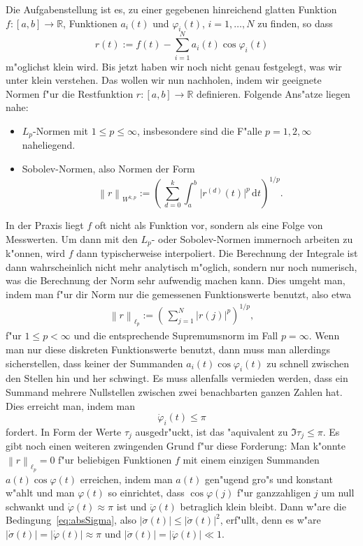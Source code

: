 \documentclass[a4paper]{scrartcl}
\newcommand{\R}{{\mathbb{R}}}
\newcommand{\de}{{\mathrm{d}}}
\newcommand{\norm}[1]{{\left\lVert#1\right\rVert}}
\newcommand{\pphi}{{\varphi}}
\begin{document}
Die Aufgabenstellung ist es, zu einer gegebenen hinreichend glatten Funktion $f:[a,b]\to\R$, Funktionen $a_i(t)$ und $\pphi_i(t)$, $i=1,\dotsc,N$ zu finden, so dass 
$$ r(t) := f(t)-\sum_{i=1}^N a_i(t)\cos\pphi_i(t) $$
m"oglichst klein wird. 
Bis jetzt haben wir noch nicht genau festgelegt, was wir unter \glqq{}klein\grqq{} verstehen. 
Das wollen wir nun nachholen, indem wir geeignete Normen f"ur die Restfunktion $r:[a,b]\to\R$ definieren. 
Folgende Ans"atze liegen nahe:
\begin{itemize}
\item $L_p$-Normen mit $1\le p\le\infty$, insbesondere sind die F"alle $p=1,2,\infty$ naheliegend. 
\item Sobolev-Normen, also Normen der Form
$$ \norm{r}_{W^{k,p}} := \left(\,\sum_{d=0}^k\int_a^b \lvert r^{(d)}(t)\rvert^p\,\de t\right)^{1/p}. $$
\end{itemize}
In der Praxis liegt $f$ oft nicht als Funktion vor, sondern als eine Folge von Messwerten. 
Um dann mit den $L_p$- oder Sobolev-Normen immernoch arbeiten zu k"onnen, wird $f$ dann typischerweise interpoliert. 
Die Berechnung der Integrale ist dann wahrscheinlich nicht mehr analytisch m"oglich, sondern nur noch numerisch, was die Berechnung der Norm sehr aufwendig machen kann. 
Dies umgeht man, indem man f"ur dir Norm nur die gemessenen Funktionswerte benutzt, also etwa
\begin{align} \label{eq:lpnormr}
\norm{r}_{\ell_p} := \left(\,\sum_{j=1}^{N}\lvert r(j)\rvert^p\right)^{1/p},
\end{align}
f"ur $1\le p<\infty$ und die entsprechende Supremumsnorm im Fall $p=\infty$. 
Wenn man nur diese diskreten Funktionswerte benutzt, dann muss man allerdings sicherstellen, dass keiner der Summanden $a_i(t)\cos\pphi_i(t)$ zu schnell zwischen den Stellen hin und her schwingt. 
Es muss allenfalls vermieden werden, dass ein Summand mehrere Nullstellen zwischen zwei benachbarten ganzen Zahlen hat. Dies erreicht man, indem man 
\begin{equation} \label{eq:dotPhiLePi}
\dot\pphi_i(t)\le\pi
\end{equation}
fordert. In Form der Werte $\tau_j$ ausgedr"uckt, ist das "aquivalent zu $\Im\tau_j\le\pi$. 
Es gibt noch einen weiteren zwingenden Grund f"ur diese Forderung: Man k"onnte $\norm{r}_{\ell_p}=0$ f"ur beliebigen Funktionen $f$ mit einem einzigen Summanden $a(t)\cos\pphi(t)$ erreichen, indem man $a(t)$ gen"ugend gro"s und konstant w"ahlt und man $\pphi(t)$ so einrichtet, dass $\cos\pphi(j)$ f"ur ganzzahligen $j$ um null schwankt und $\dot\pphi(t)\approx\pi$ ist und $\ddot\pphi(t)$ betraglich klein bleibt. 
Dann w"are die Bedingung~\eqref{eq:absSigma}, also $\lvert\ddot\sigma(t)\rvert\le\lvert\dot\sigma(t)\rvert^2$,  erf"ullt, denn es w"are $ \lvert\dot\sigma(t)\rvert = \lvert\dot\pphi(t)\rvert \approx \pi $ und $\lvert\ddot\sigma(t)\rvert=\lvert\ddot\pphi(t)\rvert \ll 1$. 
\end{document}
